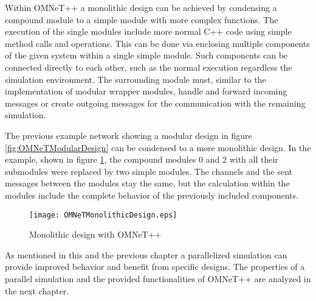 Within OMNeT++ a monolithic design can be achieved by condensing a compound module to a simple module with more complex functions.
The execution of the single modules include more normal C++ code using simple method calls and operations.
This can be done via enclosing multiple components of the given system within a single simple module.
Such components can be connected directly to each other, such as the normal execution regardless the simulation environment.
The surrounding module must, similar to the implementation of modular wrapper modules, handle and forward incoming messages or create outgoing messages for the communication with the remaining simulation.

The previous example network showing a modular design in figure \ref{fig:OMNeTModularDesign} can be condensed to a more monolithic design.
In the example, shown in figure \ref{fig:OMNeTMonolithicDesign}, the compound modules 0 and 2 with all their submodules were replaced by two simple modules.
The channels and the sent messages between the modules stay the same, but the calculation within the modules include the complete behavior of the previously included components.

\begin{figure}
    \centering
    \texttt{[image: OMNeTMonolithicDesign.eps]}
    \caption{Monolithic design with OMNeT++}
    \label{fig:OMNeTMonolithicDesign}
\end{figure}

As mentioned in this and the previous chapter a parallelized simulation can provide improved behavior and benefit from specific designs.
The properties of a parallel simulation and the provided functionalities of OMNeT++ are analyzed in the next chapter.